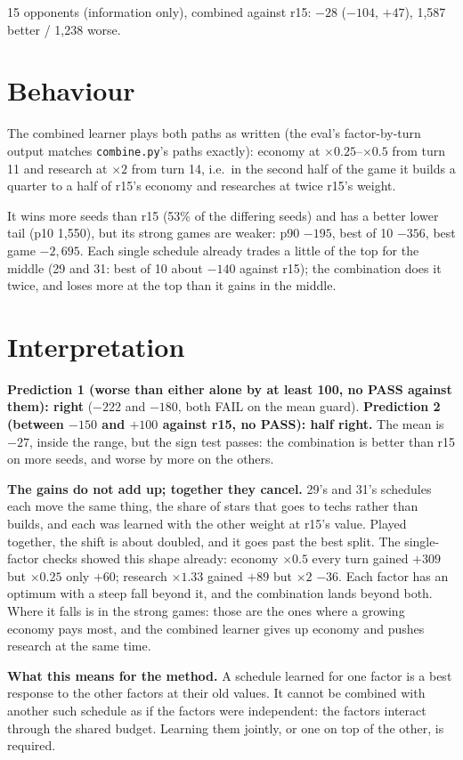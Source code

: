 \documentclass{../polyexp}
\begin{document}
15 opponents (information only), combined against r15: $-28$ ($-104$, $+47$), 1{,}587 better / 1{,}238 worse.

\section{Behaviour}
The combined learner plays both paths as written (the eval's factor-by-turn output matches \texttt{combine.py}'s
paths exactly): economy at $\times0.25$--$\times0.5$ from turn 11 and research at $\times2$ from turn 14, i.e.\ in the
second half of the game it builds a quarter to a half of r15's economy and researches at twice r15's weight.

It wins more seeds than r15 (53\% of the differing seeds) and has a better lower tail (p10 1{,}550), but its strong
games are weaker: p90 $-195$, best of 10 $-356$, best game $-2{,}695$. Each single schedule already trades a little of
the top for the middle (29 and 31: best of 10 about $-140$ against r15); the combination does it twice, and loses
more at the top than it gains in the middle.

\section{Interpretation}
\textbf{Prediction 1 (worse than either alone by at least 100, no PASS against them): right} ($-222$ and $-180$, both
FAIL on the mean guard).
\textbf{Prediction 2 (between $-150$ and $+100$ against r15, no PASS): half right.} The mean is $-27$, inside the range,
but the sign test passes: the combination is better than r15 on more seeds, and worse by more on the others.

\textbf{The gains do not add up; together they cancel.} 29's and 31's schedules each move the same thing, the share
of stars that goes to techs rather than builds, and each was learned with the other weight at r15's value. Played
together, the shift is about doubled, and it goes past the best split. The single-factor checks showed this shape
already: economy $\times0.5$ every turn gained $+309$ but $\times0.25$ only $+60$; research $\times1.33$ gained $+89$
but $\times2$ $-36$. Each factor has an optimum with a steep fall beyond it, and the combination lands beyond both.
Where it falls is in the strong games: those are the ones where a growing economy pays most, and the combined
learner gives up economy and pushes research at the same time.

\textbf{What this means for the method.} A schedule learned for one factor is a best response to the other factors
at their old values. It cannot be combined with another such schedule as if the factors were independent: the
factors interact through the shared budget. Learning them jointly, or one on top of the other, is required.
\end{document}

